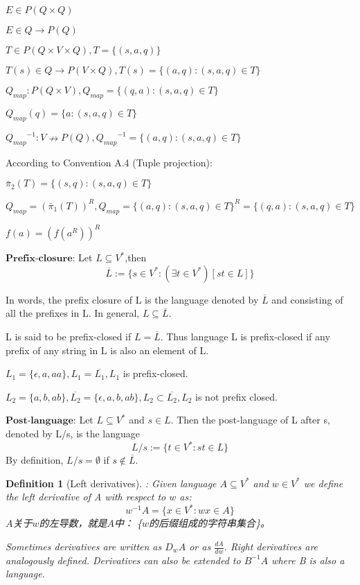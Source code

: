 \documentclass[graybox,envcountchap,sectrefs]{svmono1}
\newtheorem{myDf}{Definition}
\begin{document}
$E \in P(Q\times Q)$

$E \in Q \to P(Q)$

\hfill

$T \in P(Q \times V \times Q), T = \{(s,a,q) \}$

$T(s)\in Q \to P(V\times Q), T(s) = \{(a,q):(s,a,q) \in T\}$

$Q_{map}: P(Q\times V), Q_{map} = \{(q,a): (s,a,q) \in T\}$

$Q_{map}(q) = \{a: (s,a,q)\in T\}$

${Q_{map}}^{-1}: V \nrightarrow P(Q), {Q_{map}}^{-1} = \{(a,q): (s,a,q) \in T\}$

According to Convention A.4 (Tuple projection):

$\bar{\pi}_2(T) = \{(s,q): (s,a,q)\in T \}$

$Q_{map} = (\bar{\pi}_1(T))^R, Q_{map} = \{(a,q):(s,a,q) \in T\}^R = \{(q,a):(s,a,q) \in T\}$

\hfill

$f(a)=(f(a^R))^R$

\hfill

$\textbf{Prefix-closure:}$ Let $L\subseteq V^*$,then
$$\overline{L} := \{s\in V^*:(\exists t\in V^*)[st\in L]\}$$

In words, the prefix closure of L is the language denoted by $\overline{L}$ and consisting of all the prefixes in L. In general, $L\subseteq \overline{L}$.

L is said to be prefix-closed if $L = \overline{L}$. Thus language L is prefix-closed if any prefix of any string in L is also an element of L.

$L_1 = \{\epsilon,a,aa\}, L_1 = \overline{L_1}, L_{1}$ is prefix-closed.

$L_2 = \{a,b,ab\}, \overline{L_2} = \{\epsilon,a,b,ab\}, L_2 \subset \overline{L_2}, L_2$ is not prefix closed.

\hfill

$\textbf{Post-language:}$ Let $L\subseteq V^{\ast}$ and $s\in L$. Then the post-language of L after s, denoted by L/s, is the language
$$ L/s := \{t\in V^{\ast}:st\in L\}$$
By definition, $L/s = \emptyset$ if $s \notin \overline{L}$.

\hfill

\begin{myDf}[Left derivatives]: Given language $A\subseteq V^{\ast}$ and $w\in V^{\ast}$ we define the left derivative of A with respect to $w$ as:
$$w^{-1}A = \{x\in V^{\ast}:wx\in A\}$$
$A$关于$w$的左导数，就是$A$中： \{$w$的后缀组成的字符串集合\}。

Sometimes derivatives are written as $D_{w}A$ or as $\frac{dA}{dw}$. Right derivatives are analogously defined. Derivatives can also be extended to $B^{-1}A$ where B is also a language.
\end{myDf}
\end{document}
